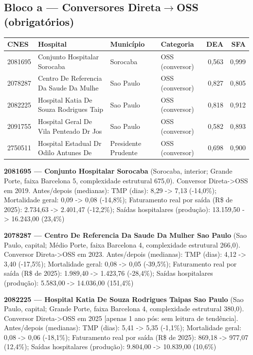 \documentclass[12pt,a4paper]{article}
\begin{document}
\subsection{Bloco a --- Conversores Direta$\to$OSS (obrigatórios)}
\begin{center}\small
\begin{tabular}{llllrr}
\toprule
CNES & Hospital & Município & Categoria & DEA & SFA \\
\midrule
2081695 & Conjunto Hospitalar Sorocaba & Sorocaba & OSS (conversor) & 0,563 & 0,999 \\
2078287 & Centro De Referencia Da Saude Da Mulhe & Sao Paulo & OSS (conversor) & 0,827 & 0,805 \\
2082225 & Hospital Katia De Souza Rodrigues Taip & Sao Paulo & OSS (conversor) & 0,818 & 0,912 \\
2091755 & Hospital Geral De Vila Penteado Dr Jos & Sao Paulo & OSS (conversor) & 0,582 & 0,893 \\
2750511 & Hospital Estadual Dr Odilo Antunes De  & Presidente Prudente & OSS (conversor) & 0,698 & 0,900 \\
\bottomrule
\end{tabular}
\end{center}
\noindent\textbf{2081695 --- Conjunto Hospitalar Sorocaba} (Sorocaba, interior; Grande Porte, faixa Barcelona 5, complexidade estrutural 675,0). Conversor Direta->OSS em 2019. Antes/depois (medianas): TMP (dias): 8,29 -> 7,13 (-14,0\%); Mortalidade geral: 0,09 -> 0,08 (-14,8\%); Faturamento real por saída (R\$ de 2025): 2.734,63 -> 2.401,47 (-12,2\%); Saídas hospitalares (produção): 13.159,50 -> 16.243,00 (23,4\%)\par\medskip
\noindent\textbf{2078287 --- Centro De Referencia Da Saude Da Mulher Sao Paulo} (Sao Paulo, capital; Médio Porte, faixa Barcelona 4, complexidade estrutural 266,0). Conversor Direta->OSS em 2023. Antes/depois (medianas): TMP (dias): 4,12 -> 3,40 (-17,5\%); Mortalidade geral: 0,08 -> 0,05 (-39,5\%); Faturamento real por saída (R\$ de 2025): 1.989,40 -> 1.423,76 (-28,4\%); Saídas hospitalares (produção): 5.583,00 -> 14.036,00 (151,4\%)\par\medskip
\noindent\textbf{2082225 --- Hospital Katia De Souza Rodrigues Taipas Sao Paulo} (Sao Paulo, capital; Grande Porte, faixa Barcelona 4, complexidade estrutural 380,0). Conversor Direta->OSS em 2025 [apenas 1 ano pós: sem leitura de tendência]. Antes/depois (medianas): TMP (dias): 5,41 -> 5,35 (-1,1\%); Mortalidade geral: 0,08 -> 0,06 (-18,1\%); Faturamento real por saída (R\$ de 2025): 869,18 -> 977,07 (12,4\%); Saídas hospitalares (produção): 9.804,00 -> 10.839,00 (10,6\%)\par\medskip
\end{document}
